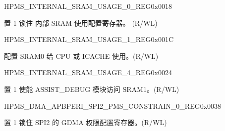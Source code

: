 \begin{register}{H}{PMS\_INTERNAL\_SRAM\_USAGE\_0\_REG}{0x0018}\label{regdesc:PMSINTERNALSRAMUSAGE0REG}
%
%
\regnewline%
\begin{regdesc}\begin{reglist}
\label{fielddesc:PMSINTERNALSRAMUSAGELOCK}\item [PMS\_INTERNAL\_SRAM\_USAGE\_LOCK]置 1 锁住 内部 SRAM 使用配置寄存器。 (R/WL)
\end{reglist}\end{regdesc}
\end{register}


\begin{register}{H}{PMS\_INTERNAL\_SRAM\_USAGE\_1\_REG}{0x001C}\label{regdesc:PMSINTERNALSRAMUSAGE1REG}
%
%
%
\regnewline%
\begin{regdesc}\begin{reglist}
\label{fielddesc:PMSINTERNALSRAMUSAGECPUCACHE}\item [PMS\_INTERNAL\_SRAM\_USAGE\_CPU\_CACHE] 配置 SRAM0 给 CPU 或 ICACHE 使用。(R/WL)
\end{reglist}\end{regdesc}
\end{register}




\begin{register}{H}{PMS\_INTERNAL\_SRAM\_USAGE\_4\_REG}{0x0024}\label{regdesc:PMSINTERNALSRAMUSAGE4REG}
%
%
\regnewline%
\begin{regdesc}\begin{reglist}
\label{fielddesc:PMSINTERNALSRAMUSAGELOGSRAM}\item [PMS\_INTERNAL\_SRAM\_USAGE\_LOG\_SRAM] 置 1 使能 ASSIST\_DEBUG 模块访问 SRAM1。(R/WL)
\end{reglist}\end{regdesc}
\end{register}





\begin{register}{H}{PMS\_DMA\_APBPERI\_SPI2\_PMS\_CONSTRAIN\_0\_REG}{0x0038}\label{regdesc:PMSDMAAPBPERISPI2PMSCONSTRAIN0REG}
%
%
\regnewline%
\begin{regdesc}\begin{reglist}
\label{fielddesc:PMSDMAAPBPERISPI2PMSCONSTRAINLOCK}\item [PMS\_DMA\_APBPERI\_SPI2\_PMS\_CONSTRAIN\_LOCK]置 1 锁住 SPI2 的 GDMA 权限配置寄存器。(R/WL)
\end{reglist}\end{regdesc}
\end{register}


